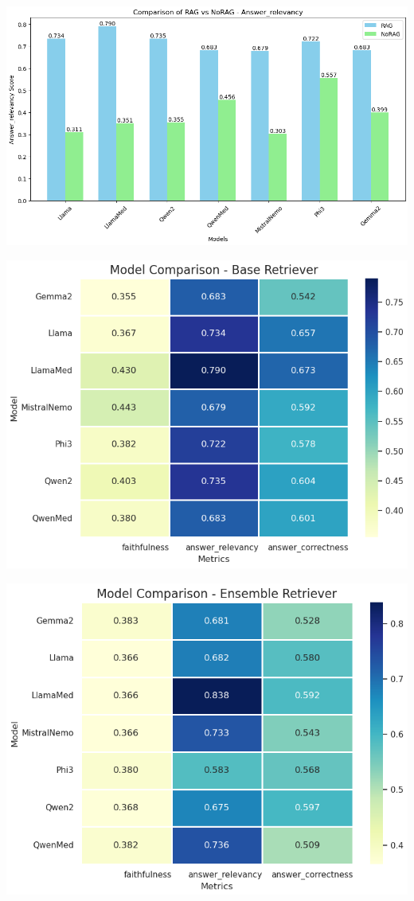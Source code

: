 \documentclass[handout]{beamer}\mode<handout>{\usetheme{AMSBolognaFC}}
\begin{document}
\begin{frame}[allowframebreaks]
    \framebreak

    \vfill
    \centering
    \includegraphics[width=\textwidth]{figures/RAGvsNoRAG_relevancy}

    \framebreak

    \vfill
    \centering
    \includegraphics[height=0.8\textheight]{figures/baseretreiver}

    \framebreak

    \vfill
    \centering
    \includegraphics[height=0.8\textheight]{figures/ensembleretriever}


\end{frame}
\end{document}
